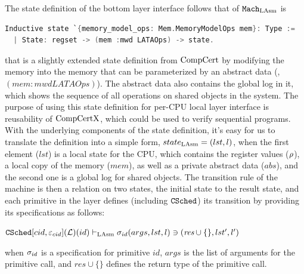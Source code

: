 The state definition of the bottom layer interface follows that of ${\mathrm{\texttt{Mach}}}_{\mathrm{LAsm}}$ is
\begin{lstlisting}[language=C]
Inductive state `{memory_model_ops: Mem.MemoryModelOps mem}: Type :=
  | State: regset -> (mem :mwd LATAOps) -> state.
\end{lstlisting}
that is a slightly extended state definition from $\mathrm{CompCert}$ by modifying the memory 
into the memory that can be parameterized by an abstract data (\ie, $(mem :mwd LATAOps)$).
The abstract data also contains the global log in it, which shows the sequence of all operations on shared objects in the system. 
The purpose of using this state definition for per-CPU local layer interface is reusability of $\mathrm{CompCertX}$, which could be used to verify sequential programs. 
With the underlying components of the state definition, 
it's easy for us to translate the definition into a simple form, $state_{\mathrm{LAsm}} = (lst, l)$,
when the first element ($lst$) is a local state for the CPU, which contains 
the register values ($\rho$), a local copy of the memory ($mem$), as well as a private abstract data ($abs$),
and the second one is a global log for shared objects.
%
The transition rule of the machine is then a relation on two states, the initial state to the result state, 
and each primitive in the layer defines (including ${{\mathrm{\texttt{CSched}}}}$) its transition by providing its specifications as follows:
\begin{center}
${{\mathrm{\texttt{CSched}}}}[cid, {\varepsilon}_{cid}](\mathcal{L})(id)
 \vdash_{\mathrm{LAsm}}  \sigma_{id}(args, lst, l) \ni (\textit{res}\cup \{\}, lst', l')$
\end{center}
{\noindent}when $\sigma_{id}$ is a specification for primitive $id$,
$args$ is the list of arguments for the primitive call, and $\textit{res}\cup \{\}$ defines the 
return type of the primitive call.


